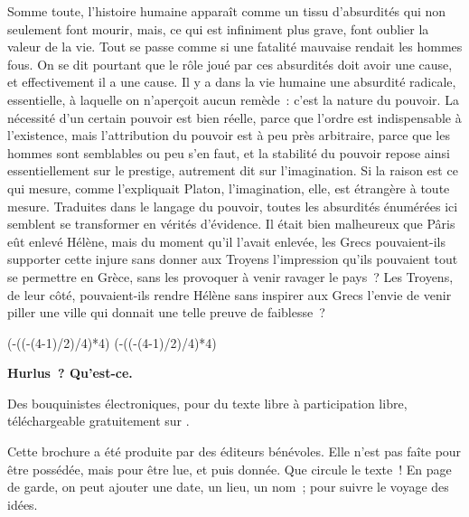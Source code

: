 \documentclass[french,twoside]{book} %
\def\truncdiv#1#2{((#1-(#2-1)/2)/#2)}
\def\moduloop#1#2{(#1-\truncdiv{#1}{#2}*#2)}
\def\modulo#1#2{\number\numexpr\moduloop{#1}{#2}\relax}
\begin{document}
Somme toute, l'histoire humaine apparaît comme un tissu d'absurdités qui non seulement font mourir, mais, ce qui est infiniment plus grave, font oublier la valeur de la vie. Tout se passe comme si une fatalité mauvaise rendait les hommes fous. On se dit pourtant que le rôle joué par ces absurdités doit avoir une cause, et effectivement il a une cause. Il y a dans la vie humaine une absurdité radicale, essentielle, à laquelle on n'aperçoit aucun remède : c'est la nature du pouvoir. La nécessité d'un certain pouvoir est bien réelle, parce que l'ordre est indispensable à l'existence, mais l'attribution du pouvoir est à peu près arbitraire, parce que les hommes sont semblables ou peu s'en faut, et la stabilité du pouvoir repose ainsi essentiellement sur le prestige, autrement dit sur l'imagination. Si la raison est ce qui mesure, comme l'expliquait Platon, l'imagination, elle, est étrangère à toute mesure. Traduites dans le langage du pouvoir, toutes les absurdités énumérées ici semblent se transformer en vérités d'évidence. Il était bien malheureux que Pâris eût enlevé Hélène, mais du moment qu'il l'avait enlevée, les Grecs pouvaient-ils supporter cette injure sans donner aux Troyens l'impression qu'ils pouvaient tout se permettre en Grèce, sans les provoquer à venir ravager le pays ? Les Troyens, de leur côté, pouvaient-ils rendre Hélène sans inspirer aux Grecs l'envie de venir piller une ville qui donnait une telle preuve de faiblesse ?
 


\ifbooklet
  \pagestyle{empty}
  \clearpage
  \ifnum\modulo{\value{page}}{4}=0 \hbox{}\newpage\hbox{}\newpage\fi
  \ifnum\modulo{\value{page}}{4}=1 \hbox{}\newpage\hbox{}\newpage\fi


  \hbox{}\newpage
  \ifodd\value{page}\hbox{}\newpage\fi
  {\centering\color{rubric}\bfseries\noindent\large
    Hurlus ? Qu’est-ce.\par
    \bigskip
  }
  \noindent Des bouquinistes électroniques, pour du texte libre à participation libre,
  téléchargeable gratuitement sur \href{https://hurlus.fr}{}.\par
  \bigskip
  \noindent Cette brochure a été produite par des éditeurs bénévoles.
  Elle n’est pas faîte pour être possédée, mais pour être lue, et puis donnée.
  Que circule le texte !
  En page de garde, on peut ajouter une date, un lieu, un nom ; pour suivre le voyage des idées.
  \par
\end{document}

